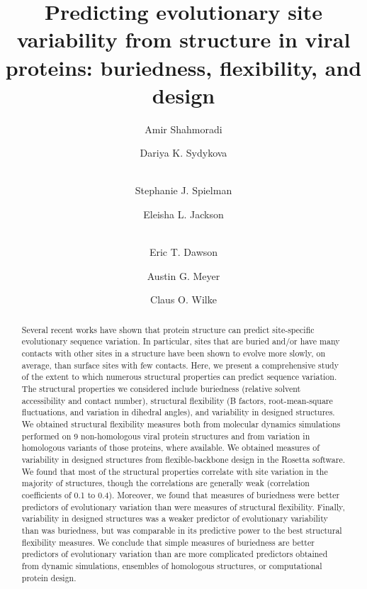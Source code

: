 \documentclass[smallextended]{svjour3}
\begin{document}
\title{Predicting evolutionary site variability from structure in viral proteins: buriedness, flexibility, and design}

\author{Amir Shahmoradi \and Dariya K. Sydykova \and \\ Stephanie J. Spielman \and Eleisha L. Jackson \and \\ Eric T. Dawson \and Austin G. Meyer \and Claus O. Wilke}


\date{}

\maketitle

\begin{abstract}
Several recent works have shown that protein structure can predict site-specific evolutionary sequence variation. In particular, sites that are buried and/or have many contacts with other sites in a structure have been shown to evolve more slowly, on average, than surface sites with few contacts. Here, we present a comprehensive study of the extent to which numerous structural properties can predict sequence variation. The structural properties we considered include buriedness (relative solvent accessibility and contact number), structural flexibility (B factors, root-mean-square fluctuations, and variation in dihedral angles), and variability in designed structures. We obtained structural flexibility measures both from molecular dynamics simulations performed on 9 non-homologous viral protein structures and from variation in homologous variants of those proteins, where available. We obtained measures of variability in designed structures from flexible-backbone design in the Rosetta software. We found that most of the structural properties correlate with site variation in the majority of structures, though the correlations are generally weak (correlation coefficients of 0.1 to 0.4). Moreover, we found that measures of buriedness were better predictors of evolutionary variation than were measures of structural flexibility. Finally, variability in designed structures was a weaker predictor of evolutionary variability than was buriedness, but was comparable in its predictive power to the best structural flexibility measures. We conclude that simple measures of buriedness are better predictors of evolutionary variation than are more complicated predictors obtained from dynamic simulations, ensembles of homologous structures, or computational protein design.
\end{abstract}
\end{document}
